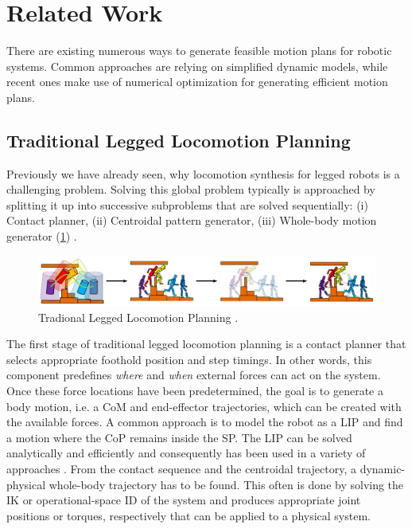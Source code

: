 \section{Related Work}\label{sec:IntroRelated}
There are existing numerous ways to generate feasible motion plans for robotic systems. Common approaches are relying on simplified dynamic models, while recent ones make use of numerical optimization for generating efficient motion plans. 

\subsection{Traditional Legged Locomotion Planning}
Previously we have already seen, why locomotion synthesis for legged robots is a challenging problem. Solving this global problem typically is approached by splitting it up into successive subproblems that are solved sequentially: (i) Contact planner, (ii) Centroidal pattern generator, (iii) Whole-body motion generator (\cref{img:traditional_locomotion_planner}) \cite{carpentier2017multi}. 
\begin{figure}[h!]
\centering	
\includegraphics[width=1\textwidth]{img/traditional_locomotion_planner.jpg}
\caption{Tradional Legged Locomotion Planning \cite{giraud2020motion}.}
\label{img:traditional_locomotion_planner}
\end{figure}  
The first stage of traditional legged locomotion planning is a contact planner that selects appropriate foothold position and step timings. In other words, this component predefines \textit{where} and \textit{when} external forces can act on the system. 
Once these force locations have been predetermined, the goal is to generate a body motion, i.e. a \gls{CoM} and end-effector trajectories, which can be created with the available forces. A common approach is to model the robot as a \gls{LIP} and find a motion where the \gls{CoP} remains inside the \gls{SP}. The \gls{LIP} can be solved analytically and efficiently and consequently has been used in a variety of approaches \cite{kajita2003biped, kalakrishnan2010fast, winkler2015planning, bellicoso2017dynamic}. 
From the contact sequence and the centroidal trajectory, a dynamic-physical whole-body trajectory has to be found. This often is done by solving the \gls{IK} \cite{espiau1992new} or operational-space \gls{ID} \cite{khatib1987unified} of the system and produces appropriate joint positions or torques, respectively that can be applied to a physical system.

